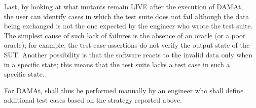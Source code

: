 Last, by looking at what mutants remain LIVE after the execution of DAMAt, the user can identify cases in which the test suite does not fail although the data being exchanged is not the one expected by the engineer who wrote the test suite.
The simplest cause of such lack of failures is the absence of an oracle (or a poor oracle); for example, the test case assertions do not verify the output state of the SUT.
Another possibility is that the software reacts to the invalid data only when in a specific state; this means that the test suite lacks a test case in such a specific state.

For DAMAt,  shall thus be performed manually by an engineer who shall define additional test cases based on the strategy reported above.


